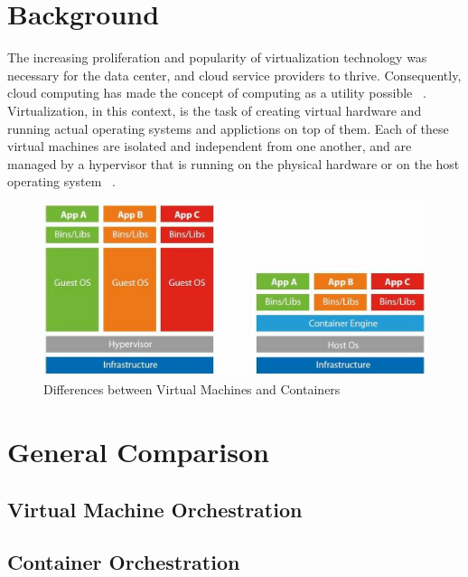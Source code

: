 \documentclass[10pt,twocolumn]{article}
\begin{document}
\section{Background}

The increasing proliferation and popularity of virtualization technology was necessary for the data center, and cloud service providers to thrive.
Consequently, cloud computing has made the concept of computing as a utility possible ~\cite{berkeley_cloud}.
Virtualization, in this context, is the task of creating virtual hardware and running actual operating systems and applictions on top of them.
Each of these virtual machines are isolated and independent from one another, and are managed by a hypervisor that is running on the physical hardware or on the host operating system ~\cite{xen}.

\begin{figure}
\centering
  \includegraphics[width=\textwidth]{container-vs-vm.jpg}
    \caption{Differences between Virtual Machines and Containers~\cite{intro_containerisation}
      \label{overflow}}
\end{figure}

\section{General Comparison}



\subsection{Virtual Machine Orchestration}



\subsection{Container Orchestration}
\end{document}
